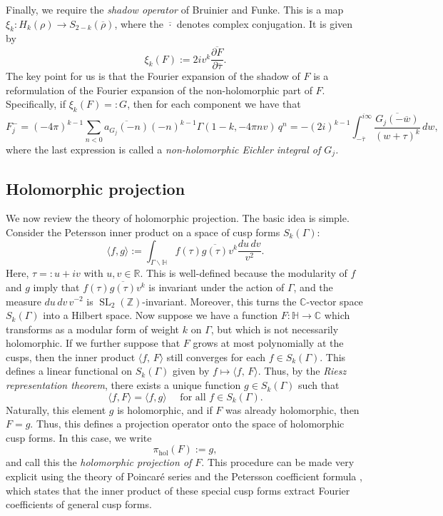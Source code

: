 \documentclass[11pt,reqno]{amsart}
\newcommand{\C}{\mathbb{C}}
\renewcommand{\=}{\;=\;}
\theoremstyle{myremark}
\begin{document}
Finally, we require the {\it shadow operator} of Bruinier and Funke. This is a map $\xi_k\colon H_k(\rho)\rightarrow S_{2-k}(\overline{\rho})$, where the $\overline{\cdot}$ denotes complex conjugation. It is given by 
\[
\xi_k(F):=2i v^k\overline{\frac{\partial F}{\partial\overline{\tau}}}.
\]
The key point for us is that the Fourier expansion of the shadow of $F$ is a reformulation of the Fourier expansion of the non-holomorphic part of $F$. 
Specifically, if $\xi_k(F)=:G$, then for each component we have that
\begin{equation}\label{EichlerInt}
F_j^-=(-4\pi)^{k-1}\sum_{n<0}\overline{a_{G_j}(-n)}(-n)^{k-1}\Gamma(1-k,-4\pi n v)\, q^n=-(2i)^{k-1}\int_{-\overline{\tau}}^{i\infty}\frac{\overline{G_j(-\overline{w})}}{(w+\tau)^k}\, dw,
\end{equation}
where the last expression is called a {\it non-holomorphic Eichler integral of $G_j$.}

\subsection{Holomorphic projection}\label{HolProjBackground} 
We now review the theory of holomorphic projection.
The basic idea is simple. 
Consider the Petersson inner product on a space of cusp forms $S_k(\Gamma)$:
\[
\langle f, g\rangle:=\int_{\Gamma\backslash \mathbb H}f(\tau)\overline{g(\tau)}
v^k\frac{du\,dv}{v^2}.
\]
Here, $\tau=:u+iv$ with $u,v\in\mathbb R$. 
This is well-defined because the modularity of $f$ and $g$ imply that $f(\tau)\overline{g(\tau)}v^k$ is invariant under the action of $\Gamma$, and the measure $du\,dv\, v^{-2}$ is $\operatorname{SL}_2(\mathbb Z)$-invariant. 
Moreover, this turns the $\C$-vector space $S_k(\Gamma)$ into a Hilbert space. 
Now suppose we have a function $F\colon\mathbb H\rightarrow\C$ which transforms as a modular form of weight $k$ on $\Gamma$, but which is not necessarily holomorphic. 
If we further suppose that $F$ grows at most polynomially at the cusps, then the inner product $\langle f,\,F\rangle$ still converges for each $f\in S_k(\Gamma)$. 
This defines a linear functional on $S_k(\Gamma)$ given by $f\mapsto\langle f,\,F\rangle$. 
Thus, by the {\it Riesz representation theorem}, there exists a unique function $g\in S_k(\Gamma)$ such that
\[
\langle f,F\rangle =\langle f,g\rangle \quad \text{ for all } f\in S_k(\Gamma). 
\]
Naturally, this element $g$ is holomorphic, and if $F$ was already holomorphic, then $F=g$. 
Thus, this defines a projection operator onto the space of holomorphic cusp forms. 
In this case, we write
\[
\pi_{\text{hol}}(F):=g,
\]
and call this the {\it holomorphic projection of $F$}. 
This procedure can be made very explicit using the theory of Poincar\'e 
series and the Petersson coefficient formula \cite[Lemma 14.3, p.359]{EK-HI-book}, which states that the inner product of these special cusp forms extract Fourier coefficients of general cusp forms. 
\end{document}
